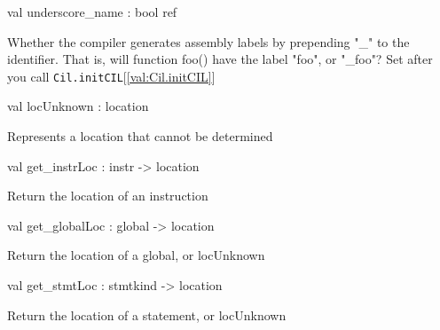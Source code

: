 \documentclass[11pt]{article}
\begin{document}
\label{val:Cil.underscore-underscorename}\begin{ocamldoccode}
val underscore_name : bool ref
\end{ocamldoccode}
\begin{ocamldocdescription}
Whether the compiler generates assembly labels by prepending "\_" to the 
    identifier. That is, will function foo() have the label "foo", or "\_foo"?
    Set after you call {\tt{Cil.initCIL}}[\ref{val:Cil.initCIL}]


\end{ocamldocdescription}




\label{val:Cil.locUnknown}\begin{ocamldoccode}
val locUnknown : location
\end{ocamldoccode}
\begin{ocamldocdescription}
Represents a location that cannot be determined


\end{ocamldocdescription}




\label{val:Cil.get-underscoreinstrLoc}\begin{ocamldoccode}
val get_instrLoc : instr -> location
\end{ocamldoccode}
\begin{ocamldocdescription}
Return the location of an instruction


\end{ocamldocdescription}




\label{val:Cil.get-underscoreglobalLoc}\begin{ocamldoccode}
val get_globalLoc : global -> location
\end{ocamldoccode}
\begin{ocamldocdescription}
Return the location of a global, or locUnknown


\end{ocamldocdescription}




\label{val:Cil.get-underscorestmtLoc}\begin{ocamldoccode}
val get_stmtLoc : stmtkind -> location
\end{ocamldoccode}
\begin{ocamldocdescription}
Return the location of a statement, or locUnknown


\end{ocamldocdescription}
\end{document}
